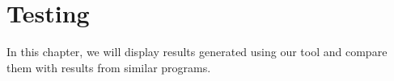 \chapter{Testing}

\label{kap:testing} %

In this chapter, we will display results generated using our tool and compare them with results from similar programs.


